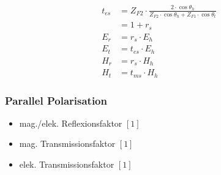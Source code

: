 \begin{align*}
    t_{e s}                           & = Z_{F 2} \cdot \frac{2 \cdot \cos \theta_h}{Z_{F 2} \cdot \cos \theta_h+Z_{F 1} \cdot \cos \theta_t}                                                           \\
                                      & = 1+r_{s}                                                                                                                                                       \\
    E_{r}                             & = r_{s} \cdot E_{h}                                                                                                                                             \\
    E_{t}                             & = t_{e s} \cdot E_{h}                                                                                                                                           \\
    H_{r}                             & = r_{s} \cdot H_{h}                                                                                                                                             \\
    H_{t}                             & = t_{m s} \cdot H_{h}
\end{align*}

\subsubsection{Parallel Polarisation}
% 


\begin{itemize}
    \item mag./elek. Reflexionsfaktor $[1]$
    \item mag. Transmissionsfaktor $[1]$
    \item elek. Transmissionsfaktor $[1]$
\end{itemize}

